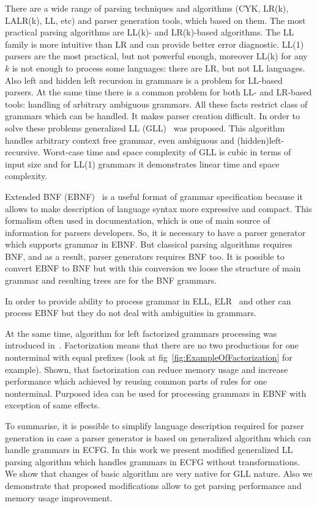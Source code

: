 \documentclass[runningheads,a4paper]{llncs}
\begin{document}
There are a wide range of parsing techniques and algorithms (CYK, LR(k), LALR(k), LL, etc) and parser generation tools, which based on them. 
The most practical parsing algorithms are LL(k)- and LR(k)-based algorithms.
The LL family is more intuitive than LR and can provide better error diagnostic.
LL(1) parsers are the most practical, but not powerful enough, moreover LL(k) for any $k$ is not enough to process some languages: there are LR, but not LL languages.
Also left and hidden left recursion in grammars is a problem for LL-based parsers.
At the same time there is a common problem for both LL- and LR-based tools: handling of arbitrary ambiguous grammars.
All these facts restrict class of grammars which can be handled. It makes parser creation difficult. 
In order to solve these problems generalized LL (GLL)~\cite{scott2010gll} was proposed. 
This algorithm handles arbitrary context free grammar, even ambiguous and (hidden)left-recursive.
Worst-case time and space complexity of GLL is cubic in terms of input size and for LL(1) grammars it demonstrates linear time and space complexity.

Extended BNF (EBNF)~\cite{EBNFISO} is a useful format of grammar specification because it allows to make description of language syntax more expressive and compact. 
This formalism often used in documentation, which is one of main source of information for parsers developers.
So, it is necessary to have a parser generator which supports grammar in EBNF.
But classical parsing algorithms requires BNF, and as a result, parser generators requires BNF too.
It is possible to convert EBNF to BNF but with this conversion we loose the structure of main grammar and resulting trees are for the BNF grammars.

In order to provide ability to process grammar in ELL, ELR~\cite{AttributedELL,ELRR,ECFGparsing,ELLParser,ELL,ECFG,ELALR,ELRParsing} and other can process EBNF but they do not deal with ambiguities in grammars.

At the same time, algorithm for left factorized grammars processing was introduced in~\cite{scott2016structuring}.
Factorization means that there are no two productions for one nonterminal with equal prefixes (look at fig~\ref{fig:ExampleOfFactorization} for example).
Shown, that factorization can reduce memory usage and increase performance which achieved by reusing common parts of rules for one nonterminal.
Purposed idea can be used for processing grammars in EBNF with exception of same effects.

To summarise, it is possible to simplify language description required for parser generation in case a parser generator is based on generalized algorithm which can handle grammars in ECFG.
In this work we present modified generalized LL parsing algorithm which handles grammars in ECFG without transformations.
We show that changes of basic algorithm are very native for GLL nature. 
Also we demonstrate that proposed modifications allow to get parsing performance and memory usage improvement.
\end{document}
